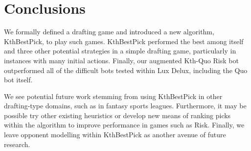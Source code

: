 \documentclass[letterpaper]{article}
\numberwithin{equation}{section}
\numberwithin{theorem}{section}
\numberwithin{lemma}{section}
\numberwithin{df}{section}
\begin{document}
\section{Conclusions}



We formally defined a drafting game and introduced a new algorithm, KthBestPick, to play such games.  KthBestPick performed the best among itself and three other potential strategies in a simple drafting game, particularly in instances with many initial actions.  Finally, our augmented Kth-Quo Risk bot outperformed all of the difficult bots tested within Lux Delux, including the Quo bot itself.


We see potential future work stemming from using KthBestPick in other drafting-type domains, such as in fantasy sports leagues.  Furthermore, it may be possible try other existing heuristics or develop new means of ranking picks within the algorithm to improve performance in games such as Risk.  Finally, we leave opponent modelling within KthBestPick as another avenue of future research.
\end{document}
